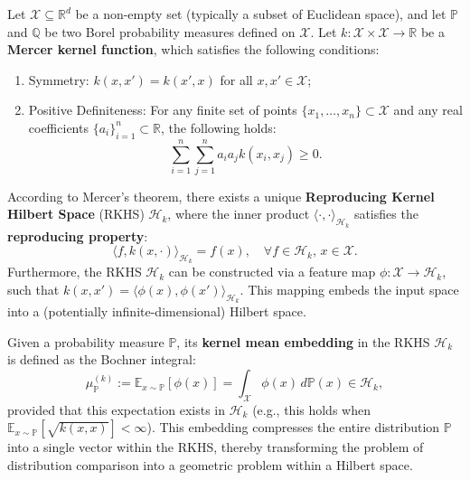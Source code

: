 \documentclass{article}
\theoremstyle{plain}
\theoremstyle{definition}
\theoremstyle{remark}
\begin{document}
Let $\mathcal{X} \subseteq \mathbb{R}^d$ be a non-empty set (typically a subset of Euclidean space), and let $\mathbb{P}$ and $\mathbb{Q}$ be two Borel probability measures defined on $\mathcal{X}$. Let $k: \mathcal{X} \times \mathcal{X} \to \mathbb{R}$ be a \textbf{Mercer kernel function}, which satisfies the following conditions:
\begin{enumerate}
    \item Symmetry: $k(x, x') = k(x', x)$ for all $x, x' \in \mathcal{X}$;
    \item Positive Definiteness: For any finite set of points $\{x_1, \dots, x_n\} \subset \mathcal{X}$ and any real coefficients $\{a_i\}_{i=1}^n \subset \mathbb{R}$, the following holds:
    \[
        \sum_{i=1}^n \sum_{j=1}^n a_i a_j k(x_i, x_j) \geq 0.
    \]
\end{enumerate}
According to Mercer's theorem, there exists a unique \textbf{Reproducing Kernel Hilbert Space} (RKHS) $\mathcal{H}_k$, where the inner product $\langle \cdot, \cdot \rangle_{\mathcal{H}_k}$ satisfies the \textbf{reproducing property}:
\[
    \langle f, k(x, \cdot) \rangle_{\mathcal{H}_k} = f(x), \quad \forall f \in \mathcal{H}_k,\, x \in \mathcal{X}.
\]
Furthermore, the RKHS $\mathcal{H}_k$ can be constructed via a feature map $\phi: \mathcal{X} \to \mathcal{H}_k$, such that $k(x, x') = \langle \phi(x), \phi(x') \rangle_{\mathcal{H}_k}$. This mapping embeds the input space into a (potentially infinite-dimensional) Hilbert space.

Given a probability measure $\mathbb{P}$, its \textbf{kernel mean embedding} in the RKHS $\mathcal{H}_k$ is defined as the Bochner integral:
\[
    \mu_{\mathbb{P}}^{(k)} := \mathbb{E}_{x \sim \mathbb{P}}[\phi(x)] = \int_{\mathcal{X}} \phi(x) \, d\mathbb{P}(x) \in \mathcal{H}_k,
\]
provided that this expectation exists in $\mathcal{H}_k$ (e.g., this holds when $\mathbb{E}_{x \sim \mathbb{P}}[\sqrt{k(x,x)}] < \infty$). This embedding compresses the entire distribution $\mathbb{P}$ into a single vector within the RKHS, thereby transforming the problem of distribution comparison into a geometric problem within a Hilbert space.
\end{document}
